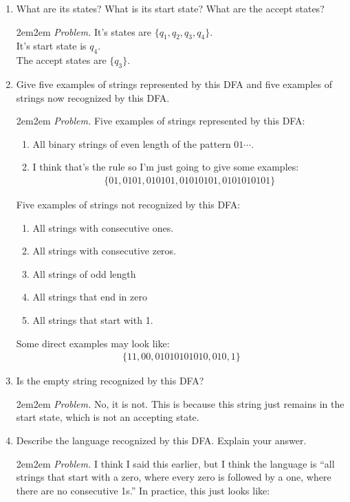 \documentclass[10pt,oneside]{book}
\newcommand{\gspc}{\vspace{0.13cm}} %
\newcommand{\gline}[0]{\gspc\\} %
\let\endoldproof\endproof
\newenvironment{problem}[1]
  {\vspace{-0.1cm}\begin{coloredadjust}\begin{adjustwidth}{2em}{2em}
   \textit{Problem. }#1}
  {\endoldproof
\end{adjustwidth}\end{coloredadjust}\gspc}
\begin{document}
\begin{enumerate}
\begin{enumerate}
    \pagebreak
    \item What are its states? What is its start state? What are the accept states?
    \begin{problem}
      It's states are $\{q_1, q_2, q_3, q_4\}$.\gline{}
      It's start state is $q_4$.\gline{}
      The accept states are $\{q_3\}$. 
    \end{problem}
    \item Give five examples of strings represented by this DFA and five examples of strings now recognized by this DFA.
    \begin{problem}
      Five examples of strings represented by this DFA:
      \begin{enumerate}
        \item All binary strings of even length of the pattern $01\cdots$.
        \item I think that's the rule so I'm just going to give some examples:
        \begin{align*}
          \{01, 0101, 010101, 01010101, 0101010101\}
        \end{align*}
      \end{enumerate}
      Five examples of strings not recognized by this DFA:
      \begin{enumerate}
        \item All strings with consecutive ones. 
        \item All strings with consecutive zeros.
        \item All strings of odd length
        \item All strings that end in zero
        \item All strings that start with 1. 
      \end{enumerate}
      Some direct examples may look like:
      \begin{align*}
        \{11, 00, 01010101010, 010, 1\}
      \end{align*}
    \end{problem}
    \item Is the empty string recognized by this DFA?
    \begin{problem}
      No, it is not. This is because this string just remains in the start state, which is not an accepting state.
    \end{problem}
    \item Describe the language recognized by this DFA. Explain your answer.
    \begin{problem}
      I think I said this earlier, but I think the language is ``all strings that start with a zero, where every zero is followed by a one, where there are no consecutive 1s.'' In practice, this just looks like:

\end{problem}
\end{enumerate}
\end{enumerate}
\end{document}
